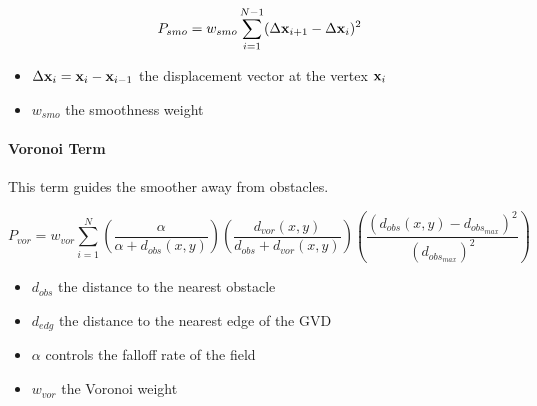\[ P_{smo} = w_{smo} \displaystyle\sum_{i=1}^{N-1} (\Delta\mathbf{x}_{i+1} - \Delta\mathbf{x}_i)^2\]

\begin{itemize}
\item $\Delta\mathbf{x}_i = \mathbf{x}_i - \mathbf{x}_{i-1}$ the displacement vector at the vertex $\mathbf{x}_i$
\item $w_{smo}$ the smoothness weight
\end{itemize}

\paragraph{Voronoi Term}
This term guides the smoother away from obstacles.

\[ P_{vor} = w_{vor} \displaystyle\sum_{i=1}^{N} \left(\frac{\alpha}{\alpha + d_{obs}(x,y)}\right)\left(\frac{d_{vor}(x,y)}{d_{obs} + d_{vor}(x,y)}\right)\left(\frac{(d_{obs}(x,y) - d_{obs_{max}})^2}{(d_{obs_{max}})^2}\right)\]

\begin{itemize}
\item $d_{obs}$ the distance to the nearest obstacle
\item $d_{edg}$ the distance to the nearest edge of the GVD
\item $\alpha$ controls the falloff rate of the field
\item $w_{vor}$ the Voronoi weight
\end{itemize}